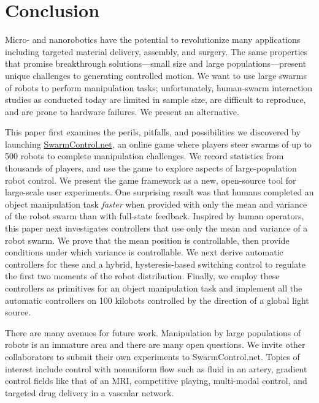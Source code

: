 \section{Conclusion}\label{sec:conclusion}
 
    Micro- and nanorobotics have the potential to revolutionize many applications including targeted material delivery, assembly, and surgery.  The same properties that promise breakthrough solutions---small size and large populations---present unique challenges to generating controlled motion. We want to use large swarms of robots to perform manipulation tasks; unfortunately, human-swarm interaction studies as conducted today are limited in sample size, are difficult to reproduce, and are prone to hardware failures. We present an alternative.

This paper first examines the perils, pitfalls, and possibilities we discovered by launching \href{http://www.swarmcontrol.net}{SwarmControl.net}, an online game where players steer swarms of up to 500 robots to complete manipulation challenges. We record statistics from thousands of players, and use the game to explore aspects of large-population robot control. We present the game framework as a new, open-source tool for large-scale user experiments. One surprising result was that humans completed an object manipulation task \emph{faster} when provided with only the mean and variance of the robot swarm than with full-state feedback. Inspired by human operators, this paper next investigates controllers that use only the mean and variance of a robot swarm. We prove that the mean position is controllable, then provide conditions under which variance is controllable.  We next derive automatic controllers for these and a hybrid, hysteresis-based switching control to regulate the first two moments of the robot distribution.  Finally, we employ these controllers as primitives for an object manipulation task and implement all the automatic controllers on 100 kilobots controlled by the direction of a global light source.
    
    
There are many avenues for future work.  Manipulation by large populations of robots is an immature area and there are many open questions. We invite other collaborators to submit their own experiments to SwarmControl.net.
Topics of interest include control with nonuniform flow such as fluid in an artery, gradient control fields like that of an MRI, competitive playing, multi-modal control, and targeted drug delivery in a vascular network.

